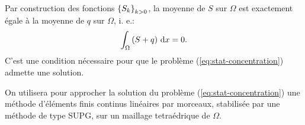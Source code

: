\begin{remarque}
  Par construction des fonctions $\left\{ S_k \right\}_{k>0}$, la moyenne de $S$ sur
  $\Omega$ est exactement égale à la moyenne de $q$ sur
  $\Omega$, i. e.:
  \begin{equation}
    \int_\Omega \left( S + q \right)\,\mathrm dx = 0.
  \end{equation}
  C'est une condition nécessaire pour que le problème
  (\ref{eq:stat-concentration}) admette une solution.
\end{remarque}

On utilisera pour approcher la solution du problème
(\ref{eq:stat-concentration}) une méthode d'éléments finis continus
linéaires par morceaux, stabilisée par une méthode de type SUPG, sur un
maillage tetraédrique de $\Omega$.
